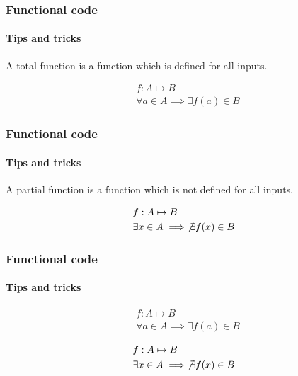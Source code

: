 \begin{frame}
    \frametitle{Functional code}
    \framesubtitle{Tips and tricks}

    A total function is a function which is defined for all inputs.

    \pause

    \begin{definition}
        \begin{align*}
        & f: A \mapsto B\\
        & \forall a \in A \implies \exists f(a) \in B
        \end{align*}
    \end{definition}
\end{frame}

\begin{frame}
    \frametitle{Functional code}
    \framesubtitle{Tips and tricks}

    A partial function is a function which is not defined for all inputs.

    \pause

    \begin{definition}
        \begin{align*}
        & f: A \mapsto B\\
        & \exists x \in A \implies \not\exists f(x) \in B
        \end{align*}
    \end{definition}
\end{frame}

\begin{frame}
    \frametitle{Functional code}
    \framesubtitle{Tips and tricks}

    \begin{definition}
        \begin{align*}
        & f: A \mapsto B\\
        & \forall a \in A \implies \exists f(a) \in B
        \end{align*}
    \end{definition}

    \begin{definition}
        \begin{align*}
        & f: A \mapsto B\\
        & \exists x \in A \implies \not\exists f(x) \in B
        \end{align*}
    \end{definition}
\end{frame}

